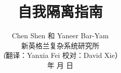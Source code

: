 \documentclass[onecolumn,journal]{IEEEtran}
\begin{document}
\title{\color{Brown} 自我隔离指南
 \\
\vspace{-0.35ex}}
\author{Chen Shen 和 Yaneer Bar-Yam \\ 新英格兰复杂系统研究所 \\
\vspace{+0.35ex}
\small{\textit（{翻译：Yanxia Fei  校对：David Xie}）}\\
  年  月  日
  \vspace{-14ex} \\


\bigskip
\bigskip

\textbf{}
 }

\maketitle


\flushbottom %



\thispagestyle{empty} %




\renewcommand{\thefootnote}{\fnsymbol{footnote}}
\end{document}
